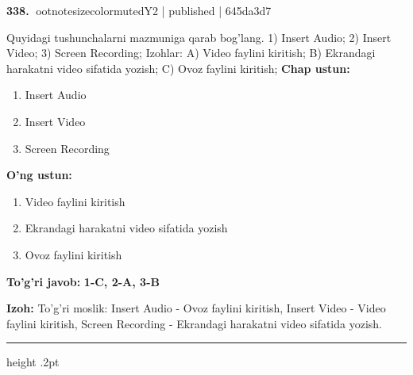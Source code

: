 \documentclass[10pt,a4paper]{article}
\begin{document}
\textbf{\color{ink}338.} {ootnotesizecolor{muted}Y2 | published | 645da3d7}
\par
Quyidagi tushunchalarni mazmuniga qarab bog'lang.  1) Insert Audio;  2) Insert Video;  3) Screen Recording;  Izohlar: A) Video faylini kiritish;  B) Ekrandagi harakatni video sifatida yozish;  C) Ovoz faylini kiritish;
\textbf{Chap ustun:}\begin{enumerate}[label=\arabic*),leftmargin=9mm]
\item Insert Audio
\item Insert Video
\item Screen Recording
\end{enumerate}
\textbf{O'ng ustun:}\begin{enumerate}[label=\Alph*),leftmargin=9mm]
\item Video faylini kiritish
\item Ekrandagi harakatni video sifatida yozish
\item Ovoz faylini kiritish
\end{enumerate}
\begin{tcolorbox}[enhanced,breakable,colback=teal!4,colframe=teal!55!black,boxrule=0.45pt,arc=1.2mm,left=2.8mm,right=2.8mm,top=2mm,bottom=2mm]
\textbf{\color{teal}To'g'ri javob:} \textbf{1-C, 2-A, 3-B}
\par\smallskip
\textbf{Izoh:} To'g'ri moslik: Insert Audio - Ovoz faylini kiritish, Insert Video - Video faylini kiritish, Screen Recording - Ekrandagi harakatni video sifatida yozish.
\end{tcolorbox}
\vspace{2mm}\hrule height .2pt\vspace{2mm}
\end{document}
